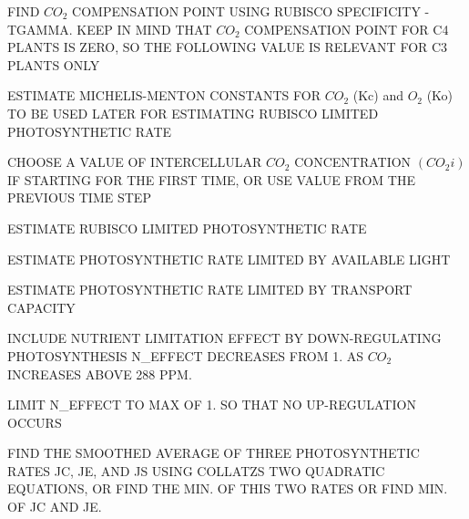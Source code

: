 F\+I\+N\+D $CO_2$ C\+O\+M\+P\+E\+N\+S\+A\+T\+I\+O\+N P\+O\+I\+N\+T U\+S\+I\+N\+G R\+U\+B\+I\+S\+C\+O S\+P\+E\+C\+I\+F\+I\+C\+I\+T\+Y -\/ T\+G\+A\+M\+M\+A. K\+E\+E\+P I\+N M\+I\+N\+D T\+H\+A\+T $CO_2$ C\+O\+M\+P\+E\+N\+S\+A\+T\+I\+O\+N P\+O\+I\+N\+T F\+O\+R C4 P\+L\+A\+N\+T\+S I\+S Z\+E\+R\+O, S\+O T\+H\+E F\+O\+L\+L\+O\+W\+I\+N\+G V\+A\+L\+U\+E I\+S R\+E\+L\+E\+V\+A\+N\+T F\+O\+R C3 P\+L\+A\+N\+T\+S O\+N\+L\+Y

E\+S\+T\+I\+M\+A\+T\+E M\+I\+C\+H\+E\+L\+I\+S-\/\+M\+E\+N\+T\+O\+N C\+O\+N\+S\+T\+A\+N\+T\+S F\+O\+R $CO_2$ (Kc) and $O_2$ (Ko) T\+O B\+E U\+S\+E\+D L\+A\+T\+E\+R F\+O\+R E\+S\+T\+I\+M\+A\+T\+I\+N\+G R\+U\+B\+I\+S\+C\+O L\+I\+M\+I\+T\+E\+D P\+H\+O\+T\+O\+S\+Y\+N\+T\+H\+E\+T\+I\+C R\+A\+T\+E

C\+H\+O\+O\+S\+E A V\+A\+L\+U\+E O\+F I\+N\+T\+E\+R\+C\+E\+L\+L\+U\+L\+A\+R $CO_2$ C\+O\+N\+C\+E\+N\+T\+R\+A\+T\+I\+O\+N $(CO_2i)$ I\+F S\+T\+A\+R\+T\+I\+N\+G F\+O\+R T\+H\+E F\+I\+R\+S\+T T\+I\+M\+E, O\+R U\+S\+E V\+A\+L\+U\+E F\+R\+O\+M T\+H\+E P\+R\+E\+V\+I\+O\+U\+S T\+I\+M\+E S\+T\+E\+P

E\+S\+T\+I\+M\+A\+T\+E R\+U\+B\+I\+S\+C\+O L\+I\+M\+I\+T\+E\+D P\+H\+O\+T\+O\+S\+Y\+N\+T\+H\+E\+T\+I\+C R\+A\+T\+E

E\+S\+T\+I\+M\+A\+T\+E P\+H\+O\+T\+O\+S\+Y\+N\+T\+H\+E\+T\+I\+C R\+A\+T\+E L\+I\+M\+I\+T\+E\+D B\+Y A\+V\+A\+I\+L\+A\+B\+L\+E L\+I\+G\+H\+T

E\+S\+T\+I\+M\+A\+T\+E P\+H\+O\+T\+O\+S\+Y\+N\+T\+H\+E\+T\+I\+C R\+A\+T\+E L\+I\+M\+I\+T\+E\+D B\+Y T\+R\+A\+N\+S\+P\+O\+R\+T C\+A\+P\+A\+C\+I\+T\+Y

I\+N\+C\+L\+U\+D\+E N\+U\+T\+R\+I\+E\+N\+T L\+I\+M\+I\+T\+A\+T\+I\+O\+N E\+F\+F\+E\+C\+T B\+Y D\+O\+W\+N-\/\+R\+E\+G\+U\+L\+A\+T\+I\+N\+G P\+H\+O\+T\+O\+S\+Y\+N\+T\+H\+E\+S\+I\+S N\+\_\+\+E\+F\+F\+E\+C\+T D\+E\+C\+R\+E\+A\+S\+E\+S F\+R\+O\+M 1. A\+S $CO_2$ I\+N\+C\+R\+E\+A\+S\+E\+S A\+B\+O\+V\+E 288 P\+P\+M.

L\+I\+M\+I\+T N\+\_\+\+E\+F\+F\+E\+C\+T T\+O M\+A\+X O\+F 1. S\+O T\+H\+A\+T N\+O U\+P-\/\+R\+E\+G\+U\+L\+A\+T\+I\+O\+N O\+C\+C\+U\+R\+S

F\+I\+N\+D T\+H\+E S\+M\+O\+O\+T\+H\+E\+D A\+V\+E\+R\+A\+G\+E O\+F T\+H\+R\+E\+E P\+H\+O\+T\+O\+S\+Y\+N\+T\+H\+E\+T\+I\+C R\+A\+T\+E\+S J\+C, J\+E, A\+N\+D J\+S U\+S\+I\+N\+G C\+O\+L\+L\+A\+T\+Z\textquotesingle{}S T\+W\+O Q\+U\+A\+D\+R\+A\+T\+I\+C E\+Q\+U\+A\+T\+I\+O\+N\+S, O\+R F\+I\+N\+D T\+H\+E M\+I\+N. O\+F T\+H\+I\+S T\+W\+O R\+A\+T\+E\+S O\+R F\+I\+N\+D M\+I\+N. O\+F J\+C A\+N\+D J\+E.

